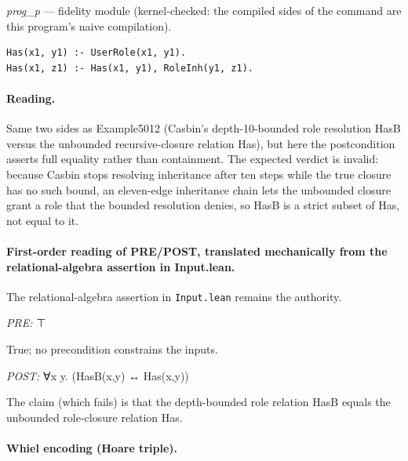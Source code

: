 \documentclass[10pt]{article}
\begin{document}
{\raggedright\textit{prog\_p} --- fidelity module (kernel-checked: the compiled sides of the command are this program's naive compilation).\par}

\begin{Verbatim}[fontsize=\scriptsize,breaklines=true,breakanywhere=true,frame=single,framesep=1.5mm]
Has(x1, y1) :- UserRole(x1, y1).
Has(x1, z1) :- Has(x1, y1), RoleInh(y1, z1).
\end{Verbatim}

\paragraph{Reading.} Same two sides as Example5012 (Casbin's depth-10-bounded role resolution HasB versus the unbounded recursive-closure relation Has), but here the postcondition asserts full equality rather than containment. The expected verdict is invalid: because Casbin stops resolving inheritance after ten steps while the true closure has no such bound, an eleven-edge inheritance chain lets the unbounded closure grant a role that the bounded resolution denies, so HasB is a strict subset of Has, not equal to it.

\paragraph{First-order reading of PRE/POST, translated mechanically from the relational-algebra assertion in Input.lean.} The relational-algebra assertion in \texttt{Input.lean} remains the authority.

\textit{PRE:} ⊤\par True; no precondition constrains the inputs.

\textit{POST:} ∀x y. (HasB(x,y) ↔ Has(x,y))\par The claim (which fails) is that the depth-bounded role relation HasB equals the unbounded role-closure relation Has.

\paragraph{Whiel encoding (Hoare triple).}
\end{document}
